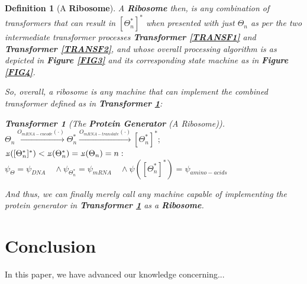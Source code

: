 \documentclass[a4paper, 18pt]{article} %
\newtheorem{defn}{Definition}
\newtheorem{transf}{Transformer}
\newcommand{\comment}[1]{}
\newcommand{\invpi}{\rotatebox[origin=c]{180}{$\pi$}}
\begin{document}
\begin{defn}[A \textbf{Ribosome}]
A \textbf{Ribosome} then, is any combination of transformers that can result in $[\Theta^*_n]^*$ when presented with just $\Theta_n$ as per the two intermediate transformer processes \textbf{Transformer \ref{TRANSF1}} and \textbf{Transformer \ref{TRANSF2}}, and whose overall processing algorithm is as depicted in \textbf{Figure \ref{FIG3}} and its corresponding state machine as in \textbf{Figure \ref{FIG4}}. 

So, overall, a ribosome is any machine that can implement the combined transformer defined as in \textbf{Transformer \ref{TRANSF3}}:

\begin{transf}[The \textbf{Protein Generator} (A Ribosome)]
\label{TRANSF3}
$\Theta_n  \xrightarrow{O_{mRNA-encode}(\cdot)}  \Theta^*_n  \xrightarrow{O_{mRNA-translate}(\cdot)} [\Theta^*_n]^*;$\\
$\invpi([\Theta^*_n]^*) < \invpi(\Theta^*_n) = \invpi(\Theta_n) = n:$\\
$\psi_{\Theta} = \psi_{DNA} \quad \land \psi_{\Theta^*_n} = \psi_{mRNA} \quad \land \psi([\Theta^*_n]^*) = \psi_{amino-acids}$
\end{transf}

And thus, we can finally merely call any machine capable of implementing the protein generator  in \textbf{Transformer \ref{TRANSF3}} as a \textbf{Ribosome}.

\end{defn}



\section{Conclusion}
\label{CONC}

In this paper, we have advanced our knowledge concerning...






\comment{
\vspace{5cm}
\fbox{
\begin{minipage}{0.9\textwidth}
\textbf{TO CITE:}\\

Lutalo, Joseph Willrich (2025). \textbf{The Theory of Sequence Transformers \& their Statistics:} \textit{The 3 Information Sequence Transformer Families (Anagrammatizers, Protractors, Compressors) and 4 New and Relevant Statistical Measures Applicable to Them: Anagram Distance, Modal Sequence Statistic, Transformation Compression Ratio and Piecemeal Compression Ratio.} figshare. Online Resource. \url{https://doi.org/10.6084/m9.figshare.29505824.v3}

\end{minipage}}
\\
}




\end{document}
